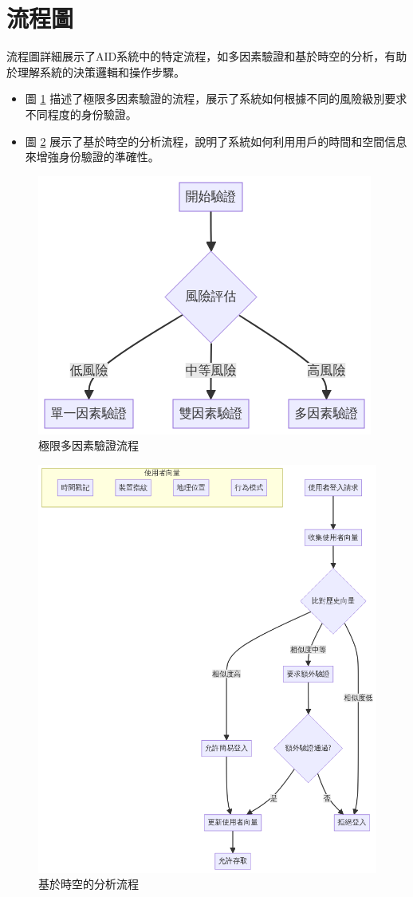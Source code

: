 \section{流程圖}
流程圖詳細展示了AID系統中的特定流程，如多因素驗證和基於時空的分析，有助於理解系統的決策邏輯和操作步驟。
\begin{itemize}
  \item 圖 \ref{fig:appendix-emfa} 描述了極限多因素驗證的流程，展示了系統如何根據不同的風險級別要求不同程度的身份驗證。
  \item 圖 \ref{fig:appendix-time-space-analysis} 展示了基於時空的分析流程，說明了系統如何利用用戶的時間和空間信息來增強身份驗證的準確性。
\end{itemize}
\begin{figure}[p]
  \centering
  \includegraphics[width=0.5\linewidth]{figures/EMFA.png}
  \caption{極限多因素驗證流程}
  \label{fig:appendix-emfa}
\end{figure}
\clearpage
\begin{figure}[p]
  \centering
  \includegraphics[width=\linewidth]{figures/time-space-analysis-uml.png}
  \caption{基於時空的分析流程}
  \label{fig:appendix-time-space-analysis}
\end{figure}
